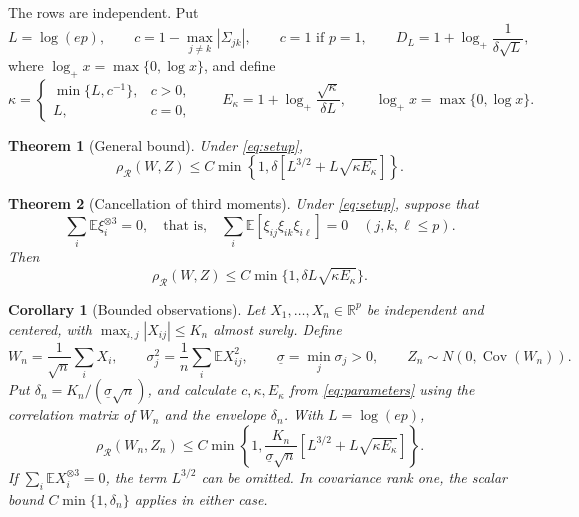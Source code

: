 \documentclass[11pt,a4paper]{article}
\newtheorem{theorem}{Theorem}
\newtheorem{corollary}{Corollary}
\theoremstyle{remark}
\newcommand{\E}{\mathbb E}
\newcommand{\R}{\mathbb R}
\newcommand{\Cov}{\operatorname{Cov}}
\newcommand{\rh}{\rho_{\mathcal R}}
\begin{document}
The rows are independent. Put
\[
L=\log(ep),\qquad c=1-\max_{j\ne k}|\Sigma_{jk}|,
\qquad c=1\text{ if }p=1,\qquad
D_L=1+\log_+\frac1{\delta\sqrt L},
\]
where \(\log_+x=\max\{0,\log x\}\), and define
\begin{equation}
 \kappa=\begin{cases}\min\{L,c^{-1}\},&c>0,\\L,&c=0,\end{cases}
 \qquad E_\kappa=1+\log_+\frac{\sqrt\kappa}{\delta L},
 \qquad \log_+x=\max\{0,\log x\}.
 \label{eq:parameters}
\end{equation}
\begin{theorem}[General bound]\label{thm:optimized}
Under \eqref{eq:setup},
\begin{equation}
 \rh(W,Z)\le C\min\!\left\{1,
 \delta\left[L^{3/2}+L\sqrt{\kappa E_\kappa}\right]\right\}.
 \tag{R*}\label{eq:optimized}
\end{equation}
\end{theorem}

\begin{theorem}[Cancellation of third moments]\label{thm:zero-skew}
Under \eqref{eq:setup}, suppose that
\begin{equation}
 \sum_i\E\xi_i^{\otimes3}=0,
 \quad\text{that is,}\quad
 \sum_i\E[\xi_{ij}\xi_{ik}\xi_{i\ell}]=0
 \quad(j,k,\ell\le p).
 \label{eq:zero-third}
\end{equation}
Then
\begin{equation}
 \rh(W,Z)\le C\min\{1,\delta L\sqrt{\kappa E_\kappa}\}.
 \tag{ZS}\label{eq:zero-skew}
\end{equation}
\end{theorem}

\begin{corollary}[Bounded observations]\label{cor:observations}
Let \(X_1,\ldots,X_n\in\R^p\) be independent and centered, with
\(\max_{i,j}|X_{ij}|\le K_n\) almost surely. Define
\[
 W_n=\frac1{\sqrt n}\sum_iX_i,\qquad
 \sigma_j^2=\frac1n\sum_i\E X_{ij}^2,
 \qquad \underline\sigma=\min_j\sigma_j>0,
 \qquad Z_n\sim N(0,\Cov(W_n)).
\]
Put \(\delta_n=K_n/(\underline\sigma\sqrt n)\), and calculate
\(c,\kappa,E_\kappa\) from \eqref{eq:parameters} using the correlation
matrix of \(W_n\) and the envelope \(\delta_n\). With \(L=\log(ep)\),
\begin{equation}
 \rh(W_n,Z_n)\le C\min\!\left\{1,
 \frac{K_n}{\underline\sigma\sqrt n}
 \left[L^{3/2}+L\sqrt{\kappa E_\kappa}\right]\right\}.
 \label{eq:observations}
\end{equation}
If \(\sum_i\E X_i^{\otimes3}=0\), the term \(L^{3/2}\) can be
omitted. In covariance rank one, the scalar bound
\(C\min\{1,\delta_n\}\) applies in either case.
\end{corollary}
\end{document}
